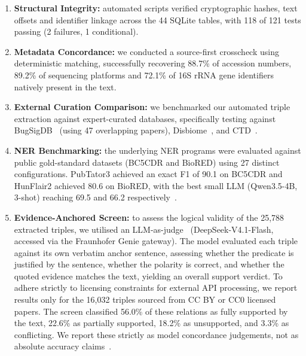 \documentclass[referee,lineno,pdflatex,sn-vancouver-num]{sn-jnl}
\theoremstyle{thmstyleone}%
\theoremstyle{thmstyletwo}%
\theoremstyle{thmstylethree}%
\begin{document}
\begin{enumerate}
\item \textbf{Structural Integrity:} automated scripts verified
cryptographic hashes, text offsets and identifier linkage across the 44
SQLite tables, with 118 of 121 tests passing (2 failures, 1 conditional).

\item \textbf{Metadata Concordance:} we conducted a source-first crosscheck
using deterministic matching, successfully recovering 88.7\% of accession
numbers, 89.2\% of sequencing platforms and 72.1\% of 16S rRNA gene identifiers
natively present in the text.

\item \textbf{External Curation Comparison:} we benchmarked our automated
triple extraction against expert-curated databases, specifically testing
against BugSigDB~\cite{geistlinger2023} (using 47 overlapping papers),
Disbiome~\cite{janssens2018disbiome}, and CTD~\cite{davis2026ctd}.

\item \textbf{NER Benchmarking:} the underlying NER programs were evaluated
against public gold-standard datasets (BC5CDR and BioRED) using 27 distinct
configurations. PubTator3 achieved an exact F1 of 90.1 on BC5CDR and
HunFlair2 achieved 80.6 on BioRED, with the best small LLM (Qwen3.5-4B,
3-shot) reaching 69.5 and 66.2 respectively~\cite{wei2024pubtator3,
sanger2024hunflair2,qwen35card}.

\item \textbf{Evidence-Anchored Screen:} to assess the logical validity of
the 25,788 extracted triples, we utilised an
LLM-as-judge~\cite{zheng2023mtbench} (DeepSeek-V4.1-Flash, accessed via the
Fraunhofer Genie gateway). The model evaluated each triple against its own
verbatim anchor sentence, assessing whether the predicate is justified by
the sentence, whether the polarity is correct, and whether the quoted
evidence matches the text, yielding an overall support verdict. To adhere
strictly to licensing constraints for external API processing, we report
results only for the 16,032 triples sourced from CC BY or CC0 licensed
papers. The screen classified 56.0\% of these relations as fully supported
by the text, 22.6\% as partially supported, 18.2\% as unsupported, and
3.3\% as conflicting. We report these strictly as model concordance
judgements, not as absolute accuracy
claims~\cite{chen2025llmbench,deepseekv41card}.


\end{enumerate}
\end{document}
